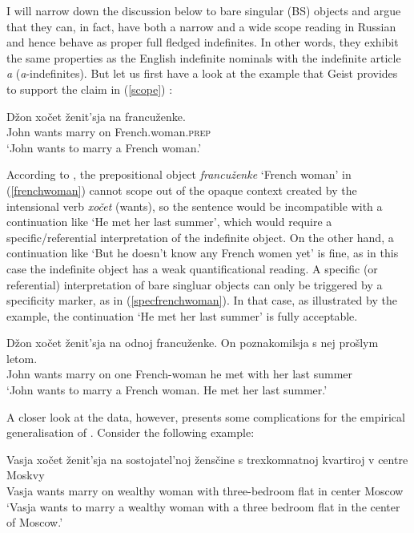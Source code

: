\documentclass[output=paper,colorlinks,citecolor=brown]{langscibook}
\begin{document}
\noindent I will narrow down the discussion below to bare singular (BS) objects and argue that they can, in fact, have both a narrow and a wide scope reading in Russian and hence behave as proper full fledged indefinites. In other words, they exhibit the same properties as the English indefinite nominals with the indefinite article \textit{a} (\textit{a}-indefinites). But let us first have a look at the example that Geist provides to support the claim in (\ref{scope}) \citep[see][211--212]{geist10}: 

\ea \gll 
D\v{z}on 	xo\v{c}et 	\v{z}enit'sja 	na 	francu\v{z}enke. \label{frenchwoman}\\
John 	wants 	marry 	on 	French.woman.\textsc{prep} \\
\glt `John wants to marry a French woman.'
\z
 
\noindent According to \citet{geist10}, the prepositional object \textit{francu\v{z}enke} `French woman' in (\ref{frenchwoman}) cannot scope out of the opaque context created by the intensional verb \textit{xo\v{c}et} (wants), so the sentence would be incompatible with a continuation like `He met her last summer', which would require a specific/referential interpretation of the indefinite object. On the other hand, a continuation like `But he doesn't know any French women yet' is fine, as in this case the indefinite object has a weak quantificational reading. A specific (or referential) interpretation of bare singluar objects can only be triggered by a specificity marker, as in (\ref{specfrenchwoman}). In that case, as illustrated by the example, the continuation `He met her last summer' is fully acceptable.

\ea \label{specfrenchwoman} \gll 
 D\v{z}on 	xo\v{c}et 	\v{z}enit'sja 	na 	odnoj francu\v{z}enke. On poznakomilsja s nej pro\v{s}lym letom.\\
John 	wants 	marry 	on 	one French-woman he met with her last summer \\
\glt `John wants to marry a French woman. He met her last summer.'
\z

\noindent  	
A closer look at the data, however, presents some complications for the empirical generalisation of \citet{geist10}. Consider the following example:  

\iffalse
\ea \gll 
Vasja xo\v{c}et 	\v{z}enit'sja na sostojatel'noj 	\v{z}ens\v{c}ine 	s 	trexkomnatnoj 	kvartiroj v 	centre Moskvy \label{trexkomnatnaja}\\
Vasja wants 	marry  on wealthy 	woman 	with 	three-bedroom 	flat in 	center Moscow \\
\glt `Vasja wants to marry a wealthy woman with a three bedroom flat in the center of Moscow.'
\z 
\end{document}
